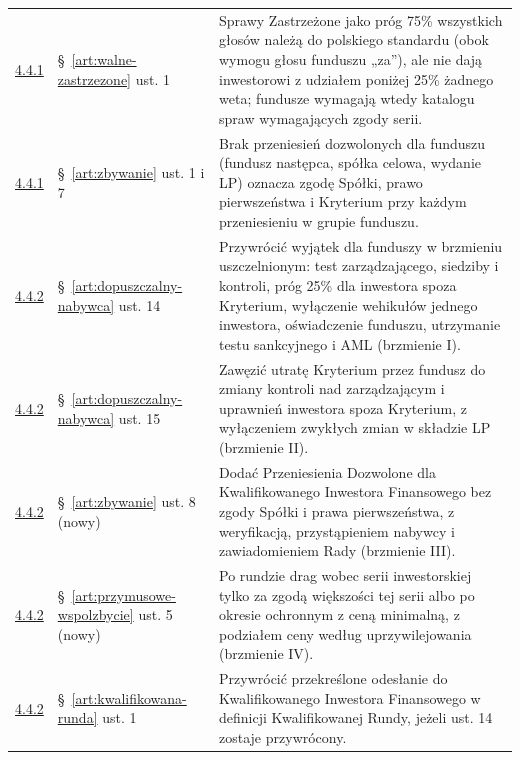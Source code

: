 \documentclass[12pt,a4paper]{report}
\begin{document}
\begin{longtable}{@{}p{1.3cm} p{3.3cm} p{9.6cm}@{}}
\hyperref[memo:4.4.1]{4.4.1} & §~\ref{art:walne-zastrzezone} ust. 1 & Sprawy Zastrzeżone jako próg 75\% wszystkich głosów należą do polskiego standardu (obok wymogu głosu funduszu „za”), ale nie dają inwestorowi z udziałem poniżej 25\% żadnego weta; fundusze wymagają wtedy katalogu spraw wymagających zgody serii. \\
\hyperref[memo:4.4.1]{4.4.1} & §~\ref{art:zbywanie} ust. 1 i 7 & Brak przeniesień dozwolonych dla funduszu (fundusz następca, spółka celowa, wydanie LP) oznacza zgodę Spółki, prawo pierwszeństwa i Kryterium przy każdym przeniesieniu w grupie funduszu. \\
\hyperref[memo:4.4.2]{4.4.2} & §~\ref{art:dopuszczalny-nabywca} ust. 14 & Przywrócić wyjątek dla funduszy w brzmieniu uszczelnionym: test zarządzającego, siedziby i kontroli, próg 25\% dla inwestora spoza Kryterium, wyłączenie wehikułów jednego inwestora, oświadczenie funduszu, utrzymanie testu sankcyjnego i AML (brzmienie I). \\
\hyperref[memo:4.4.2]{4.4.2} & §~\ref{art:dopuszczalny-nabywca} ust. 15 & Zawęzić utratę Kryterium przez fundusz do zmiany kontroli nad zarządzającym i uprawnień inwestora spoza Kryterium, z wyłączeniem zwykłych zmian w składzie LP (brzmienie II). \\
\hyperref[memo:4.4.2]{4.4.2} & §~\ref{art:zbywanie} ust. 8 (nowy) & Dodać Przeniesienia Dozwolone dla Kwalifikowanego Inwestora Finansowego bez zgody Spółki i prawa pierwszeństwa, z weryfikacją, przystąpieniem nabywcy i zawiadomieniem Rady (brzmienie III). \\
\hyperref[memo:4.4.2]{4.4.2} & §~\ref{art:przymusowe-wspolzbycie} ust. 5 (nowy) & Po rundzie drag wobec serii inwestorskiej tylko za zgodą większości tej serii albo po okresie ochronnym z ceną minimalną, z podziałem ceny według uprzywilejowania (brzmienie IV). \\
\hyperref[memo:4.4.2]{4.4.2} & §~\ref{art:kwalifikowana-runda} ust. 1 & Przywrócić przekreślone odesłanie do Kwalifikowanego Inwestora Finansowego w definicji Kwalifikowanej Rundy, jeżeli ust. 14 zostaje przywrócony. \\
\bottomrule
\end{longtable}
\end{document}
